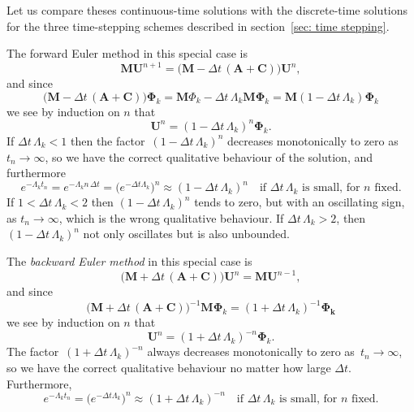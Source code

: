 Let us compare theses continuous-time solutions with the discrete-time 
solutions for the three time-stepping schemes described in 
section~\ref{sec: time stepping}.  

\begin{example}
The forward Euler method in this special case is
\[
\boldsymbol{M}\boldsymbol{U}^{n+1}=\bigl(\boldsymbol{M}
-\Delta t\,(\boldsymbol{A}+\boldsymbol{C})\bigr)\boldsymbol{U}^n,
\]
and since
\[
\bigl(\boldsymbol{M} 
-\Delta t\,(\boldsymbol{A}+\boldsymbol{C})\bigr)\boldsymbol{\Phi}_k
    =\boldsymbol{M}\Phi_k-\Delta t\,\Lambda_k\boldsymbol{M}\boldsymbol{\Phi}_k
    =\boldsymbol{M}(1-\Delta t\,\Lambda_k)\boldsymbol{\Phi}_k
\]
we see by induction on $n$ that
\[
\boldsymbol{U}^n=(1-\Delta t\,\Lambda_k)^n\boldsymbol{\Phi}_k.
\]
If $\Delta t\,\Lambda_k<1$ then the factor~$(1-\Delta t\,\Lambda_k)^n$ 
decreases monotonically to zero as~$t_n\to\infty$, so we have the correct 
qualitative behaviour of the solution, and furthermore
\[
e^{-\Lambda_kt_n}=e^{-\Lambda_k n\,\Delta t}
    =\bigl(e^{-\Delta t\Lambda_k}\bigr)^n\approx(1-\Delta t\,\Lambda_k)^n
    \quad\text{if $\Delta t\,\Lambda_k$ is small, for $n$ fixed.}
\]
If $1<\Delta t\,\Lambda_k<2$ then $(1-\Delta t\,\Lambda_k)^n$ tends to zero, 
but with an oscillating sign, as $t_n\to\infty$, which is the wrong qualitative 
behaviour. If $\Delta t\,\Lambda_k>2$, then $(1-\Delta t\,\Lambda_k)^n$ not 
only oscillates but is also unbounded.
\end{example}

\begin{example}
The \emph{backward Euler method} in this special case is
\[
\bigl(\boldsymbol{M}+\Delta t\,(\boldsymbol{A}+\boldsymbol{C})\bigr) 
    \boldsymbol{U}^n=\boldsymbol{M}\boldsymbol{U}^{n-1},
\]
and since
\[
\bigl(\boldsymbol{M} +\Delta t\,(\boldsymbol{A}+\boldsymbol{C})\bigr)^{-1}
\boldsymbol{M}\boldsymbol{\Phi}_k
    =(1+\Delta t\,\Lambda_k)^{-1}\boldsymbol{\Phi_k}
\]
we see by induction on $n$ that
\[
\boldsymbol{U}^n=(1+\Delta t\,\Lambda_k)^{-n}\boldsymbol{\Phi}_k.
\]
The factor~$(1+\Delta t\,\Lambda_k)^{-n}$ always decreases monotonically to 
zero as~$t_n\to\infty$, so we have the correct qualitative behaviour no matter 
how large $\Delta t$.  Furthermore,
\[
e^{-\Lambda_kt_n}=\bigl(e^{-\Delta t\Lambda_k}\bigr)^n
    \approx(1+\Delta t\,\Lambda_k)^{-n}
    \quad\text{if $\Delta t\,\Lambda_k$ is small, for $n$ fixed.}
\]
\end{example}

